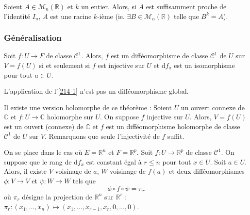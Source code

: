 
	\begin{application}
		Soient $A \in \mathcal{M}_n(\mathbb{R})$ et $k$ un entier. Alors, si $A$ est suffisamment proche de l'identité $I_n$, $A$ est une racine $k$-ième (ie. $\exists B \in \mathcal{M}_n(\mathbb{R})$ telle que $B^k = A$).
	\end{application}

	\subsubsection{Généralisation}


	\begin{theorem}
		Soit $f : U \rightarrow F$ de classe $\mathcal{C}^1$. Alors, $f$ est un difféomorphisme de classe $\mathcal{C}^1$ de $U$ sur $V = f(U)$ si et seulement si $f$ est injective sur $U$ et $\mathrm{d}f_a$ est un isomorphisme pour tout $a \in U$.
	\end{theorem}


	\begin{example}
		L'application de l'\cref{214-1} n'est pas un difféomorphisme global.
	\end{example}


	\begin{remark}
		Il existe une version holomorphe de ce théorème :
		\newpar
		Soient $U$ un ouvert connexe de $\mathbb{C}$ et $f : U \rightarrow \mathbb{C}$ holomorphe sur $U$. On suppose $f$ injective sur $U$. Alors, $V = f(U)$ est un ouvert (connexe) de $\mathbb{C}$ et $f$ est un difféomorphisme holomorphe de classe $\mathcal{C}^1$ de $U$ sur $V$.
		\newpar
		Remarquons que seule l'injectivité de $f$ suffit.
	\end{remark}


	\begin{theorem}
		On se place dans le cas où $E = \mathbb{R}^n$ et $F = \mathbb{R}^p$. Soit $f : U \rightarrow \mathbb{R}^p$ de classe $\mathcal{C}^1$. On suppose que le rang de $\mathrm{d}f_x$ est constant égal à $r \leq n$ pour tout $x \in U$. Soit $a \in U$. Alors, il existe $V$ voisinage de $a$, $W$ voisinage de $f(a)$ et deux difféomorphismes $\phi : V \rightarrow V$ et $\psi : W \rightarrow W$ tels que
		\[ \phi \circ f \circ \psi = \pi_r \]
		où $\pi_r$ désigne la projection de $\mathbb{R}^n$ sur $\mathbb{R}^r$ : $\pi_r : (x_1, \dots, x_n) \mapsto (x_1, \dots, x_{r-1}, x_r, 0, \dots, 0)$.
	\end{theorem}

